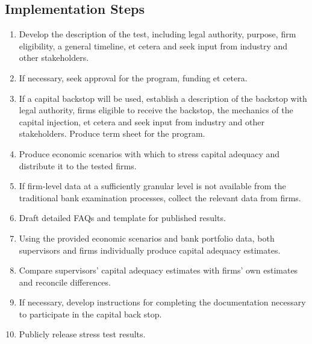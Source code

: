 \documentclass[12pt]{article}
\begin{document}
\subsection{Implementation Steps}

\begin{enumerate}

\item Develop the description of the test, including legal authority, purpose, firm eligibility, a general timeline, et cetera and seek input from industry and other stakeholders.
\item If necessary, seek approval for the program, funding et cetera.
\item If a capital backstop will be used, establish a description of the backstop with legal authority, firms eligible to receive the backstop, the mechanics of the capital injection, et cetera and seek input from industry and other stakeholders. Produce term sheet for the program.
\item Produce economic scenarios with which to stress capital adequacy and distribute it to the tested firms.
\item If firm-level data at a sufficiently granular level is not available from the traditional bank examination processes, collect the relevant data from firms.
\item Draft detailed FAQs and template for published results.
\item Using the provided economic scenarios and bank portfolio data, both supervisors and firms individually produce capital adequacy estimates.
\item Compare supervisors' capital adequacy estimates with firms' own estimates and reconcile differences.
\item If necessary, develop instructions for completing the documentation necessary to participate in the capital back stop.
\item Publicly release stress test results.

\end{enumerate}
\end{document}
